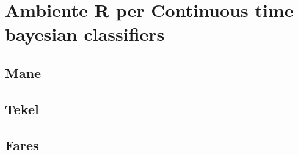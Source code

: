 
\chapter{Ambiente R per Continuous time bayesian classifiers}
\label{cap:r}

\lipsum[1]

\section{Mane}
\lipsum[2]

\section{Tekel}
\lipsum[3]

\section{Fares}
\lipsum[4-5]
